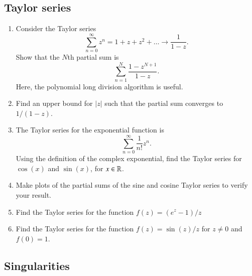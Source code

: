 \documentclass[12pt]{report}
\begin{document}
\subsection{Taylor series}



\begin{enumerate}
    \item  Consider the Taylor series
    \begin{equation}
        \sum_{n=0}^\infty z^n  = 1 + z + z^2 + \ldots \longrightarrow \frac{1}{1-z}.
    \end{equation}
    Show that the $N$th partial sum is
    \begin{equation}
        \sum_{n=1}^{N} \frac{1 - z^{N+1}}{1 - z}.
    \end{equation}
    Here, the polynomial long division algorithm is useful.
    \item Find an upper bound for $|z|$ such that the partial sum converges to $1/(1-z)$.
    \item  The Taylor series for the exponential function is
    \begin{equation}
        \sum_{n=0}^\infty \frac{1}{n!} z^n.
    \end{equation}
    Using the definition of the complex exponential, find the Taylor series for $\cos(x)$ and $\sin(x)$, for $x\in\mathbb{R}$.
    \item Make plots of the partial sums of the sine and cosine Taylor series to verify your result.
    \item Find the Taylor series for the function $f(z) = (e^z - 1)/z$
    \item Find the Taylor series for the function $f(z) = \sin(z)/z$ for $z\neq 0$ and $f(0) = 1$.
\end{enumerate}

\subsection{Singularities}
\end{document}
